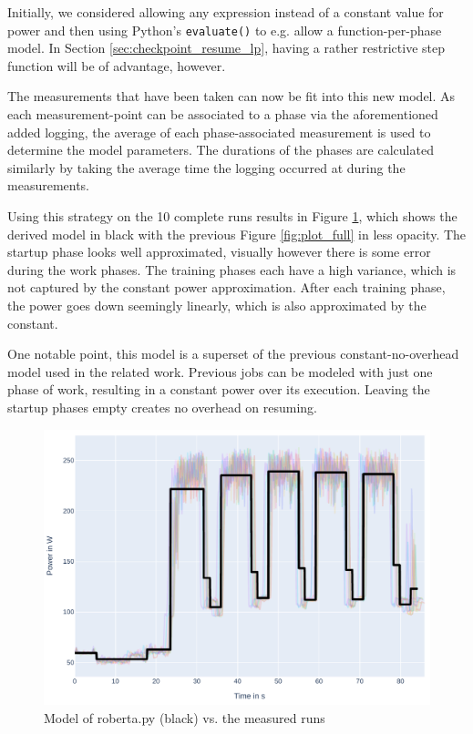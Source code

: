 Initially, we considered allowing any expression instead of a constant value for power and then using Python's \verb|evaluate()| to e.g. allow a function-per-phase model.
In Section \ref{sec:checkpoint_resume_lp}, having a rather restrictive step function will be of advantage, however. 

The measurements that have been taken can now be fit into this new model. 
As each measurement-point can be associated to a phase via the aforementioned added logging, the average of each phase-associated measurement is used to determine the model parameters. 
The durations of the phases are calculated similarly by taking the average time the logging occurred at during the measurements.

Using this strategy on the 10 complete runs results in Figure \ref{fig:model_overlaid}, which shows the derived model in black with the previous Figure \ref{fig:plot_full} in less opacity. 
The startup phase looks well approximated, visually however there is some error during the work phases.
The training phases each have a high variance, which is not captured by the constant power approximation. After each training  phase, the power goes down seemingly linearly, which is also approximated by the constant.

One notable point, this model is a superset of the previous constant-no-overhead model used in the related work.
Previous jobs can be modeled with just one phase of work, resulting in a constant power over its execution. Leaving the startup phases empty creates no overhead on resuming.

\begin{figure}
    \includegraphics[width=\linewidth]{power-measurements/model_overlaid.pdf}
    \caption{Model of roberta.py (black) vs. the measured runs}
    \label{fig:model_overlaid}
\end{figure}

